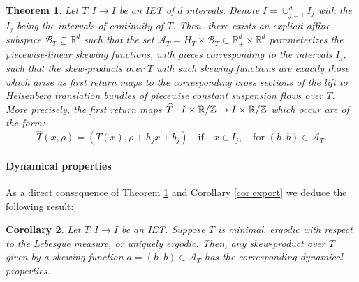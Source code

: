 \documentclass{amsart}
\newtheorem{theorem}{Theorem}[section]
\newtheorem{corollary}[theorem]{Corollary}
\theoremstyle{definition}
\theoremstyle{remark}
\numberwithin{equation}{section}
\newcommand{\wT}{\widehat{T}}
\newcommand{\<}{{\langle}}
\renewcommand{\>}{{\rangle}}
\newcommand{\field}[1]{\mathbb{#1}}
\newcommand{\R}{\field{R}}
\newcommand{\Z}{\field{Z}}
\newcommand{\jayadev}[1]{{\color{purple} \sf  J: [#1]}}
\begin{document}

\begin{theorem}
    \label{theorem:admissible}
    Let $T \colon I \to I$ be an IET of $d$ intervals. Denote $I = \cup_{j=1}^d I_j$ with the $I_j$ being the intervals of continuity of $T$. Then, there exists an explicit affine subspace $\mathcal B_T \subseteq \R^d$ such that the set $\mathcal{A}_T = H_T \times \mathcal B_T \subset \R_+^d \times \R^d$ parameterizes the  piecewise-linear skewing functions, with pieces corresponding to the intervals $I_j$, such that the skew-products over $T$ with such skewing functions are exactly those which arise as first return maps to the corresponding cross sections  of the lift to Heisenberg translation bundles of piecewise constant suspension flows over $T$. More precisely, the first return maps $\smash{\wT}: I \times \R/\Z \to I \times \R/\Z$ which occur are of the form: $$\wT(x, \rho) = (T(x), \rho + h_j x+b_j) \quad \text{if} \quad x \in I_j, \quad \text{for $(h, b) \in \mathcal A_T$}.$$
\end{theorem}

\paragraph*{\bf Dynamical properties} As a direct consequence of Theorem \ref{theorem:admissible} and Corollary \ref{cor:export} we deduce the following result:

\begin{corollary}\label{cor:admissible}
    Let $T \colon I \to I$ be an IET. Suppose $T$ is minimal, ergodic with respect to the Lebesgue measure, or uniquely ergodic. Then, any skew-product over $T$ given by a skewing function $a = (h, b) \in \mathcal{A}_T$ has the corresponding dynamical properties.
\end{corollary}
\end{document}

